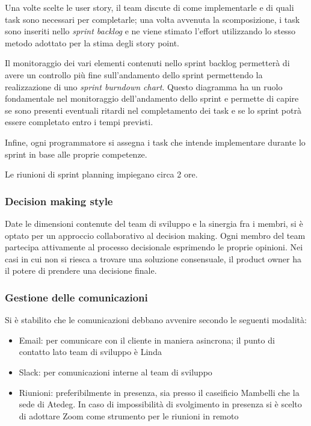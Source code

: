 Una volte scelte le user story, il team discute di come implementarle e di quali task sono necessari per completarle; una volta avvenuta la scomposizione, i task sono inseriti nello \emph{sprint backlog} e ne viene stimato l'effort utilizzando lo stesso metodo adottato per la stima degli story point.

Il monitoraggio dei vari elementi contenuti nello sprint backlog permetterà di avere un controllo più fine sull'andamento dello sprint permettendo la realizzazione di uno \emph{sprint burndown chart}. Questo diagramma ha un ruolo fondamentale nel monitoraggio dell'andamento dello sprint e permette di capire se sono presenti eventuali ritardi nel completamento dei task e se lo sprint potrà essere completato entro i tempi previsti.

Infine, ogni programmatore si assegna i task che intende implementare durante lo sprint in base alle proprie competenze.

Le riunioni di sprint planning impiegano circa 2 ore.

\subsubsection{Decision making style}
Date le dimensioni contenute del team di sviluppo e la sinergia fra i membri, si è optato per un approccio collaborativo al decision making. Ogni membro del team partecipa attivamente al processo decisionale esprimendo le proprie opinioni.
Nei casi in cui non si riesca a trovare una soluzione consensuale, il product owner ha il potere di prendere una decisione finale.

\subsubsection{Gestione delle comunicazioni}
Si è stabilito che le comunicazioni debbano avvenire secondo le seguenti modalità:
\begin{itemize}
  \item Email: per comunicare con il cliente in maniera asincrona; il punto di contatto lato team di sviluppo è Linda
  \item Slack: per comunicazioni interne al team di sviluppo
  \item Riunioni: preferibilmente in presenza, sia presso il caseificio Mambelli che la sede di Atedeg. In caso di impossibilità di svolgimento in presenza si è scelto di adottare Zoom come strumento per le riunioni in remoto
\end{itemize}



